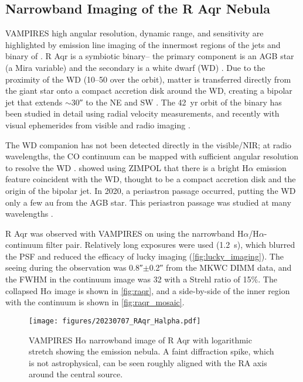 \subsection{Narrowband Imaging of the R Aqr Nebula\label{sec:raqr}}

VAMPIRES high angular resolution, dynamic range, and sensitivity are highlighted by emission line imaging of the innermost regions of the jets and binary of . R Aqr is a symbiotic binary-- the primary component is an AGB star (a Mira variable) and the secondary is a white dwarf (WD) \citep{merrill_partial_1935,merrill_spectra_1940}. Due to the proximity of the WD (\SIrange{10}{50}{\mas} over the orbit), matter is transferred directly from the giant star onto a compact accretion disk around the WD, creating a bipolar jet that extends $\sim$\ang{;;30} to the NE and SW \citep[and references therein]{schmid_spherezimpol_2017}. The \SI{42}{yr} orbit of the binary has been studied in detail using radial velocity measurements, and recently with visual ephemerides from visible and radio imaging \citep{gromadzki_spectroscopic_2009,bujarrabal_high-resolution_2018,alcolea_determining_2023}. 

The WD companion has not been detected directly in the visible/NIR; at radio wavelengths, the CO continuum can be mapped with sufficient angular resolution to resolve the WD \citep{bujarrabal_high-resolution_2018,alcolea_determining_2023}. \citet{schmid_spherezimpol_2017} showed using ZIMPOL that there is a bright H$\alpha$ emission feature coincident with the WD, thought to be a compact accretion disk and the origin of the bipolar jet. In 2020, a periastron passage occurred, putting the WD only a few \si{au} from the AGB star. This periastron passage was studied at many wavelengths \citep{hinkle_2020_2022,sacchi_front-row_2024}.

R Aqr was observed with VAMPIRES on  using the narrowband H$\alpha$/H$\alpha$-continuum filter pair. Relatively long exposures were used (\SI{1.2}{s}), which blurred the PSF and reduced the efficacy of lucky imaging (\autoref{fig:lucky_imaging}). The seeing during the observation was \ang{;;0.8}$\pm$\ang{;;0.2} from the MKWC DIMM data, and the FWHM in the continuum image was \SI{32}{\mas} with a Strehl ratio of 15\%. The collapsed H$\alpha$ image is shown in \autoref{fig:raqr}, and a side-by-side of the inner region with the continuum is shown in \autoref{fig:raqr_mosaic}.


\begin{figure}[h]
    \centering
    \texttt{[image: figures/20230707\_RAqr\_Halpha.pdf]}
    \caption{VAMPIRES H$\alpha$ narrowband image of R Aqr with logarithmic stretch showing the emission nebula. A faint diffraction spike, which is not astrophysical, can be seen roughly aligned with the RA axis around the central source.\label{fig:raqr}}
\end{figure}

